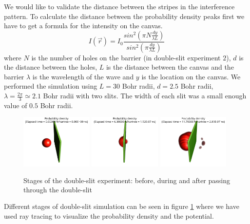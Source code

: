 We would like to validate the distance between the stripes in the interference pattern.
To calculate the distance between the probability density peaks first we have to get a formula for the intensity on the canvas.
\begin{equation}
	\label{eq:Huygens}
	I(\vec{r}) = I_0 \frac{sin^2\left( \pi N \frac{dy}{\lambda L} \right)}{sin^2\left( \pi \frac{dy}{\lambda L} \right)}
\end{equation}
where $N$ is the number of holes on the barrier (in double-slit experiment $2$), $d$ is the distance between the holes, $L$ is the distance between the canvas and the barrier $\lambda$ is the wavelength of the wave and $y$ is the location on the canvas.
We performed the simulation using $L = 30$ Bohr radii, $d = 2.5$ Bohr radii, $\lambda = \frac{2\pi}{3}\simeq 2.1$ Bohr radii with two slits.
The width of each slit was a small enough value of $0.5$ Bohr radii.
\begin{figure}
	\begin{center}
		\includegraphics[width=0.32\textwidth]{figures/double_slit_01.png}
		\includegraphics[width=0.32\textwidth]{figures/double_slit_02.png}
		\includegraphics[width=0.32\textwidth]{figures/double_slit_03.png}
		\caption{Stages of the double-slit experiment: before, during and after passing through the double-slit}
		\label{fig:double_slit_stages}
	\end{center}
\end{figure}
Different stages of double-slit simulation can be seen in figure \ref{fig:double_slit_stages} where we have used ray tracing to visualize the probability density and the potential.

